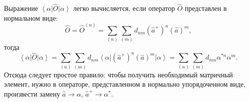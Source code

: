 Выражение $\left<\alpha\right|\hat{O}\left|\alpha\right>$ легко
вычисляется, если оператор $\hat{O}$ представлен в нормальном виде:
\begin{equation}
\hat{O} = \hat{O}^{(n)} = \sum_{(n)}\sum_{(m)} d_{nm}
\left(\hat{a}^{+}\right)^n
\left(\hat{a}\right)^m,
\label{eqCh1_normalO}
\end{equation}
тогда
\begin{equation}
\left<\alpha\right|\hat{O}\left|\alpha\right> = 
\sum_{(n)}\sum_{(m)} d_{nm}
\left<\alpha\right|
\left(\hat{a}^{+}\right)^n
\left(\hat{a}\right)^m
\left|\alpha\right> = 
\sum_{(n)}\sum_{(m)} d_{nm}
\alpha^{*n}\alpha^{m}.
\end{equation}
Отсюда следует простое правило: чтобы получить необходимый матричный
элемент, нужно в операторе, представленном в нормально упорядоченном
виде, произвести замену $\hat{a}\rightarrow\alpha$, 
$\hat{a}^{+}\rightarrow\alpha^{*}$.

